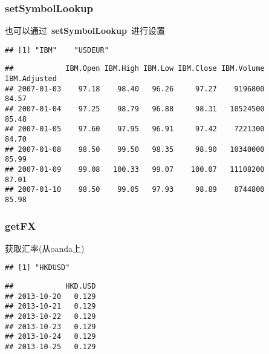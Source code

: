 \subsubsection{setSymbolLookup}
也可以通过~\textbf{setSymbolLookup}~进行设置
\begin{knitrout}
\color{fgcolor}\begin{kframe}
\begin{alltt}
\hlstd{(} \hlstd{=} \hlstd{(} \hlstd{=} \hlstd{,}  \hlstd{=} \hlstd{),}
                 \hlstd{=} \hlstd{(} \hlstd{=} \hlstd{,}  \hlstd{=} \hlstd{))}
\hlstd{(}\hlstd{(}\hlstd{,} \hlstd{))}
\end{alltt}
\begin{verbatim}
## [1] "IBM"    "USDEUR"
\end{verbatim}
\begin{alltt}
\end{alltt}
\begin{verbatim}
##            IBM.Open IBM.High IBM.Low IBM.Close IBM.Volume IBM.Adjusted
## 2007-01-03    97.18    98.40   96.26     97.27    9196800        84.57
## 2007-01-04    97.25    98.79   96.88     98.31   10524500        85.48
## 2007-01-05    97.60    97.95   96.91     97.42    7221300        84.70
## 2007-01-08    98.50    99.50   98.35     98.90   10340000        85.99
## 2007-01-09    99.08   100.33   99.07    100.07   11108200        87.01
## 2007-01-10    98.50    99.05   97.93     98.89    8744800        85.98
\end{verbatim}
\end{kframe}
\end{knitrout}
\subsubsection{getFX}
获取汇率(从oanda上)
\begin{knitrout}
\color{fgcolor}\begin{kframe}
\begin{alltt}
\hlstd{(}\hlstd{,}  \hlstd{=} \hlstd{,}  \hlstd{=} \hlstd{,}
       
\end{alltt}
\begin{verbatim}
## [1] "HKDUSD"
\end{verbatim}
\begin{alltt}
\hlstd{(}\hlstd{,}  
\end{alltt}
\begin{verbatim}
##            HKD.USD
## 2013-10-20   0.129
## 2013-10-21   0.129
## 2013-10-22   0.129
## 2013-10-23   0.129
## 2013-10-24   0.129
## 2013-10-25   0.129
\end{verbatim}
\end{kframe}
\end{knitrout}
